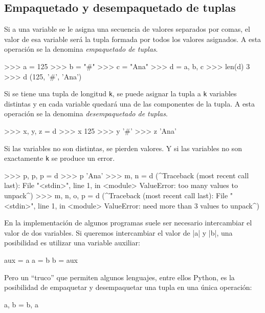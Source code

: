 \subsection{Empaquetado y desempaquetado de tuplas}
Si a una variable se le asigna una secuencia de valores separados por comas,
el valor de esa variable será la tupla formada por todos los valores asignados.
A esta operación se la denomina \emph{empaquetado de tuplas}.

\begin{codigo-python-sn}
>>> a = 125
>>> b = "#"
>>> c = "Ana"
>>> d = a, b, c
>>> len(d)
3
>>> d
(125, '#', 'Ana')
\end{codigo-python-sn}

Si se tiene una tupla de longitud \lstinline+k+, se puede asignar
la tupla a \lstinline+k+ variables distintas y en cada variable quedará
una de las componentes de la tupla. A esta operación se la denomina
\emph{desempaquetado de tuplas}.

\begin{codigo-python-sn}
>>> x, y, z = d
>>> x
125
>>> y
'#'
>>> z
'Ana'
\end{codigo-python-sn}

\begin{atencion}
Si las variables no son distintas, se pierden valores. Y si las variables
no son exactamente \lstinline+k+ se produce un error.

\begin{codigo-python-sn}
>>> p, p, p = d
>>> p
'Ana'
>>> m, n = d
(^Traceback (most recent call last):
  File "<stdin>", line 1, in <module>
ValueError: too many values to unpack^)
>>> m, n, o, p = d
(^Traceback (most recent call last):
  File "<stdin>", line 1, in <module>
ValueError: need more than 3 values to unpack^)
\end{codigo-python-sn}
\end{atencion}

\begin{sabias_que}
En la implementación de algunos programas suele ser necesario intercambiar el
valor de dos variables. Si queremos intercambiar el valor de |a| y |b|, una
posibilidad es utilizar una variable auxiliar:

\begin{codigo-python-sn}
aux = a
a = b
b = aux
\end{codigo-python-sn}

Pero un ``truco'' que permiten algunos lenguajes, entre ellos Python, es la
posibilidad de empaquetar y desempaquetar una tupla en una única operación:

\begin{codigo-python-sn}
a, b = b, a
\end{codigo-python-sn}
\end{sabias_que}

